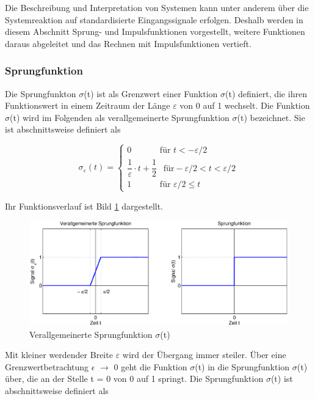\noindent Die Beschreibung und Interpretation von Systemen kann unter anderem \"{u}ber die Systemreaktion auf standardisierte Eingangssignale erfolgen. Deshalb werden in diesem Abschnitt Sprung- und Impulsfunktionen vorgestellt, weitere Funktionen daraus abgeleitet und das Rechnen mit Impulsfunktionen vertieft.


\subsubsection{ Sprungfunktion}

\noindent Die Sprungfunkton $\sigma$(t) ist als Grenzwert einer Funktion $\sigma$(t) definiert, die ihren Funktionswert in einem Zeitraum der Länge $\varepsilon$ von 0 auf 1 wechselt. Die Funktion $\sigma$(t) wird im Folgenden als verallgemeinerte Sprungfunktion $\sigma$(t) bezeichnet. Sie ist abschnittsweise definiert als 

\begin{equation}\label{eq:onetwentyfour}
\sigma _{\varepsilon} (t)=\left\{\begin{array}{ll}
{0 \qquad \quad \text{ für } t<-\varepsilon /2} \\
{\dfrac{1}{\varepsilon } \cdot  t +\dfrac{1}{2} \;\, \text{ für} -\varepsilon /2<t<\varepsilon /2} \\
{1 \qquad \quad \text{ für } \varepsilon /2 \le t} \end{array}\right.
\end{equation}


\noindent Ihr Funktionsverlauf ist Bild \ref{fig:NaeherungSprungfunktion} dargestellt.

\begin{figure}[H]
  \includegraphics[width=1.0\textwidth]{Kapitel1/Bilder/image6.eps}
  \caption{Verallgemeinerte Sprungfunktion $\sigma$(t)}
  \label{fig:NaeherungSprungfunktion}
\end{figure}


\noindent Mit kleiner werdender Breite $\varepsilon$ wird der \"{U}bergang immer steiler. \"{U}ber eine Grenzwertbetrachtung $\epsilon$ $\rightarrow$ 0 geht die Funktion $\sigma$(t) in die Sprungfunktion $\sigma$(t) \"{u}ber, die an der Stelle t = 0 von 0 auf 1 springt. Die Sprungfunktion $\sigma$(t) ist abschnittsweise definiert als

